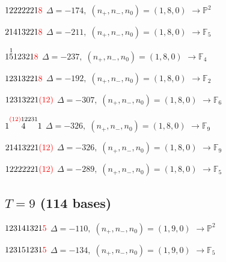 \documentclass[10pt]{article}
\begin{document}
\smallskip

$12222221\textcolor{red}{8}$ \quad $\Delta=-174,\; (n_+,n_-,n_0)=(1,8,0)$ \quad $\to \mathbb{P}^2$

\smallskip

$21413221\textcolor{red}{8}$ \quad $\Delta=-211,\; (n_+,n_-,n_0)=(1,8,0)$ \quad $\to \mathbb{F}_{5}$

\smallskip

$1\overset{1}{5}12321\textcolor{red}{8}$ \quad $\Delta=-237,\; (n_+,n_-,n_0)=(1,8,0)$ \quad $\to \mathbb{F}_{4}$

\smallskip

$12313221\textcolor{red}{8}$ \quad $\Delta=-192,\; (n_+,n_-,n_0)=(1,8,0)$ \quad $\to \mathbb{F}_{2}$

$12313221\textcolor{red}{(12)}$ \quad $\Delta=-307,\; (n_+,n_-,n_0)=(1,8,0)$ \quad $\to \mathbb{F}_{6}$

\smallskip

$1\overset{\textcolor{red}{(12)}12231}{4}1$ \quad $\Delta=-326,\; (n_+,n_-,n_0)=(1,8,0)$ \quad $\to \mathbb{F}_{9}$

\smallskip

$21413221\textcolor{red}{(12)}$ \quad $\Delta=-326,\; (n_+,n_-,n_0)=(1,8,0)$ \quad $\to \mathbb{F}_{9}$

\smallskip

$12222221\textcolor{red}{(12)}$ \quad $\Delta=-289,\; (n_+,n_-,n_0)=(1,8,0)$ \quad $\to \mathbb{F}_{5}$


\subsection*{$T = 9$ \quad (114 bases)}
\smallskip

$123141321\textcolor{red}{5}$ \quad $\Delta=-110,\; (n_+,n_-,n_0)=(1,9,0)$ \quad $\to \mathbb{P}^2$

\smallskip

$123151231\textcolor{red}{5}$ \quad $\Delta=-134,\; (n_+,n_-,n_0)=(1,9,0)$ \quad $\to \mathbb{F}_{5}$

\smallskip
\end{document}
